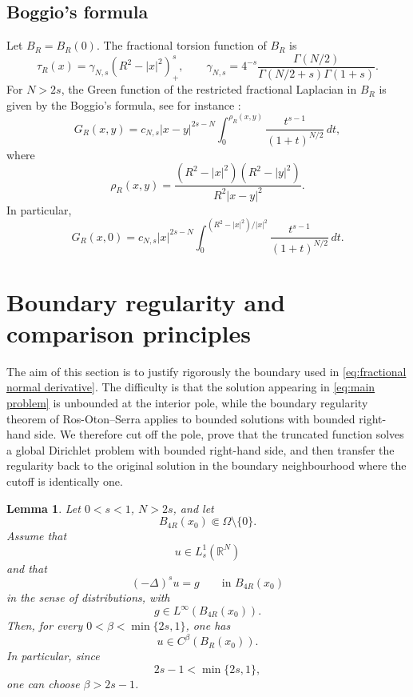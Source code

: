 \documentclass[11pt,a4paper]{article}
\newtheorem{lemma}[theorem]{Lemma}
\newcommand{\dd}{\,d}
\begin{document}
\subsection{Boggio's formula}

Let \(B_R=B_R(0)\). The fractional torsion function of \(B_R\) is
\[
\tau_{R}(x)=\gamma_{N,s}(R^2-|x|^2)^s_+,
\qquad
\gamma_{N,s}
=
4^{-s}
\frac{\Gamma(N/2)}{\Gamma(N/2+s)\Gamma(1+s)}.
\]
For \(N>2s\), the Green function of the restricted fractional Laplacian in \(B_R\) is given by the Boggio's formula, see for instance \cite{AbatangeloJarohsSaldana, Bucur}:
\[
G_{R}(x,y)=
c_{N,s}|x-y|^{2s-N}
\int_0^{\rho_R(x,y)}
\frac{t^{s-1}}{(1+t)^{N/2}}\dd t,
\]
where
\[
\rho_R(x,y)=
\frac{(R^2-|x|^2)(R^2-|y|^2)}
{R^2|x-y|^2}.
\]
In particular,
\[
G_{R}(x,0)
=
c_{N,s}|x|^{2s-N}
\int_0^{(R^2-|x|^2)/|x|^2}
\frac{t^{s-1}}{(1+t)^{N/2}}\dd t.
\]


\section{Boundary regularity and comparison principles}
\label{sec:boundary-quotient-singular}


The aim of this section is to justify rigorously the boundary used in
\eqref{eq:fractional normal derivative}. The difficulty is that the
solution appearing in \eqref{eq:main problem} is unbounded at the interior
pole, while the boundary regularity theorem of Ros-Oton--Serra applies to
bounded solutions with bounded right-hand side. We therefore cut off the pole,
prove that the truncated function solves a global Dirichlet problem with
bounded right-hand side, and then transfer the regularity back to the
original solution in the boundary neighbourhood where the cutoff is identically one.

\begin{lemma}
\label{holder interno}
Let \(0<s<1\), \(N>2s\), and let
\[
B_{4R}(x_0)\Subset \Omega\setminus\{0\}.
\]
Assume that
\[
u\in L^1_s(\mathbb R^N)
\]
and that
\[
(-\Delta)^s u=g
\qquad\text{in }B_{4R}(x_0)
\]
in the sense of distributions, with
\[
g\in L^\infty(B_{4R}(x_0)).
\]
Then, for every \(0<\beta<\min\{2s,1\}\),
one has
\[
u\in C^\beta(B_R(x_0)).
\]
In particular, since
\[
2s-1<\min\{2s,1\},
\]
one can choose \(\beta>2s-1\).
\end{lemma}
\end{document}
